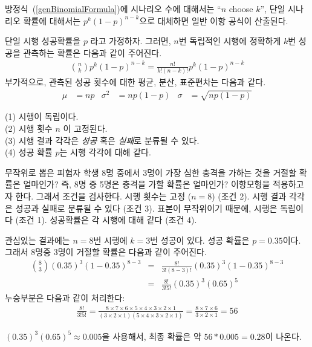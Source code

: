 방정식~(\ref{genBinomialFormula})에 시나리오 수에 대해서는 ``$n$ choose $k$'', 단일 시나리오 확률에 대해서는 $p^k(1-p)^{n-k}$으로 대체하면 일반 이항 공식이 산출된다.

\begin{termBox}{ 
단일 시행 성공확률을 $p$ 라고 가정하자. 그러면, $n$번 독립적인 시행에 정확하게 $k$번 성공을 관측하는 확률은 다음과 같이 주어진다.\vspace{-1mm}
\begin{eqnarray}
{n\choose k}p^k(1-p)^{n-k} = \frac{n!}{k!(n-k)!}p^k(1-p)^{n-k}
\label{binomialFormula}
\end{eqnarray}
부가적으로, 관측된 성공 횟수에 대한 평균, 분산, 표준편차는 다음과 같다. \vspace{-2mm}
\begin{align}
\mu &= np
	&\sigma^2 &= np(1-p)
	&\sigma &= \sqrt{np(1-p)}
\label{binomialStats}
\end{align}}
\end{termBox}

\begin{tipBox}{
(1) 시행이 독립이다. \\
(2) 시행 횟수 $n$ 이 고정된다. \\
(3) 시행 결과 각각은 \emph{성공} 혹은 \emph{실패}로 분류될 수 있다. \\
(4) 성공 확률 $p$는 시행 각각에 대해 같다.}
\end{tipBox}

\begin{example}{무작위로 뽑은 피험자 학생 8명 중에서 3명이 가장 심한 충격을 가하는 것을 거절할 확률은 얼마인가? 즉, 8명 중 5명은 충격을 가할 확률은 얼마인가?}
이항모형을 적용하고자 한다. 그래서 조건을 검사한다. 시행 횟수는 고정 ($n=8$) (조건 2). 시행 결과 각각은 성공과 실패로 분류될 수 있다 (조건 3). 표본이 무작위이기 때문에, 시행은 독립이다 (조건 1). 성공확률은 각 시행에 대해 같다 (조건 4).

관심있는 결과에는 $n=8$번 시행에 $k=3$번 성공이 있다. 성공 확률은 $p=0.35$이다. 그래서 8명중 3명이 거절할 확률은 다음과 같이 주어진다.
\begin{eqnarray*}
{ 8 \choose 3}(0.35)^3(1-0.35)^{8-3}
	&=& \frac{8!}{3!(8-3)!}(0.35)^3(1-0.35)^{8-3} \\
	&=& \frac{8!}{3!5!}(0.35)^3(0.65)^5
\end{eqnarray*}
누승부분은 다음과 같이 처리한다:
\begin{eqnarray*}
\frac{8!}{3!5!} = \frac{8\times7\times6\times5\times4\times3\times2\times1}{(3\times2\times1)(5\times4\times3\times2\times1)} = \frac{8\times7\times6}{3\times2\times1} = 56
\end{eqnarray*}

$(0.35)^3(0.65)^5 \approx 0.005$을 사용해서, 최종 확률은 약 $56*0.005 = 0.28$이 나온다.
\end{example}

